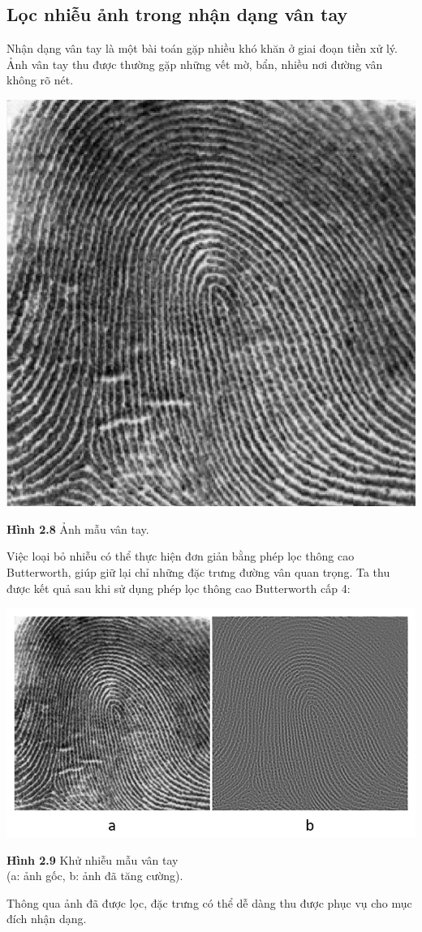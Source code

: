\subsection{Lọc nhiễu ảnh trong nhận dạng vân tay}
Nhận dạng vân tay là một bài toán gặp nhiều khó khăn ở giai đoạn tiền xử lý. Ảnh vân tay thu được thường gặp những vết mờ, bẩn, nhiều nơi đường vân không rõ nét. 
\begin{center}
    \includegraphics[scale=0.4]{Figures/anh_van_tay.jpg}
    \par \textbf {Hình 2.8} Ảnh mẫu vân tay.
\end{center}
Việc loại bỏ nhiễu có thể thực hiện đơn giản bằng phép lọc thông cao Butterworth, giúp giữ lại chỉ những đặc trưng đường vân quan trọng. Ta thu được kết quả sau khi sử dụng phép lọc thông cao Butterworth cấp 4:
\begin{center}
    \includegraphics[scale=0.8]{Figures/fig13.png}
    \par \textbf {Hình 2.9} Khử nhiễu mẫu vân tay \\ (a: ảnh gốc, b: ảnh đã tăng cường).
\end{center}
Thông qua ảnh đã được lọc, đặc trưng có thể dễ dàng thu được phục vụ cho mục đích nhận dạng.
